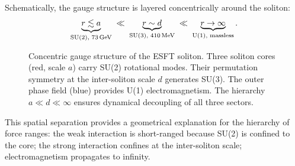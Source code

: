 \documentclass[a4paper,12pt]{article}
\begin{document}
Schematically, the gauge structure is layered concentrically around
the soliton:
\begin{gather}
 \underbrace{r \lesssim a}_{\text{SU(2), 73\,GeV}}
 \;\ll\;
 \underbrace{r \sim d}_{\text{SU(3), 410\,MeV}}
 \;\ll\;
 \underbrace{r \to \infty}_{\text{U(1), massless}}.
\end{gather}

\begin{figure}[t]
\centering
{}
\caption{Concentric gauge structure of the ESFT soliton. Three
 soliton cores (red, scale $a$) carry SU(2) rotational modes.
 Their permutation symmetry at the inter-soliton scale $d$ generates
 SU(3). The outer phase field (blue) provides U(1)
 electromagnetism. The hierarchy $a \ll d \ll \infty$ ensures
 dynamical decoupling of all three sectors.}
\label{fig:scales}
\end{figure}

This spatial separation provides a geometrical explanation for the
hierarchy of force ranges: the weak interaction is short-ranged
because SU(2) is confined to the core; the strong interaction
confines at the inter-soliton scale; electromagnetism propagates
to infinity.
\end{document}
